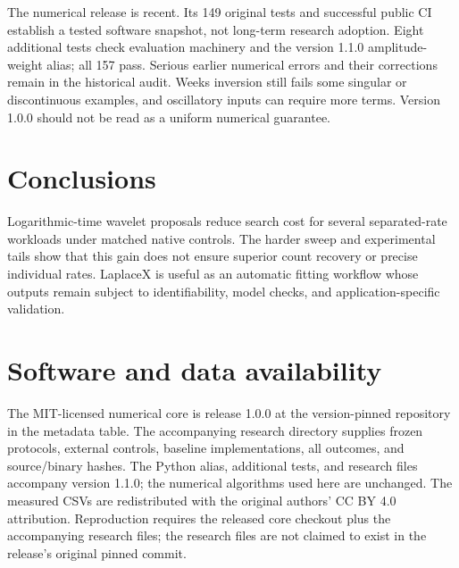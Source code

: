 \documentclass[preprint,11pt]{elsarticle}
\begin{document}
The numerical release is recent. Its 149 original tests and successful public
CI establish a tested software snapshot, not long-term research adoption.
Eight additional tests check evaluation machinery and the version 1.1.0
amplitude-weight alias; all 157 pass. Serious earlier numerical errors and their
corrections remain in the historical audit. Weeks inversion still fails some
singular or discontinuous examples, and oscillatory inputs can require more
terms. Version 1.0.0 should not be read as a uniform numerical guarantee.

\section{Conclusions}
Logarithmic-time wavelet proposals reduce search cost for several separated-rate
workloads under matched native controls. The harder sweep and experimental
tails show that this gain does not ensure superior count recovery or precise
individual rates. LaplaceX is useful as an automatic fitting workflow whose
outputs remain subject to identifiability, model checks, and application-specific
validation.

\clearpage
\section*{Software and data availability}
The MIT-licensed numerical core is release 1.0.0 at the version-pinned repository
in the metadata table. The accompanying research directory supplies frozen
protocols, external controls, baseline implementations, all outcomes, and
source/binary hashes. The Python alias, additional tests, and research files accompany version
1.1.0; the numerical algorithms used here are unchanged.
The measured CSVs are redistributed with the original authors' CC BY 4.0
attribution. Reproduction requires the released core checkout plus the
accompanying research files; the research files are not claimed to exist in
the release's original pinned commit.



\end{document}

